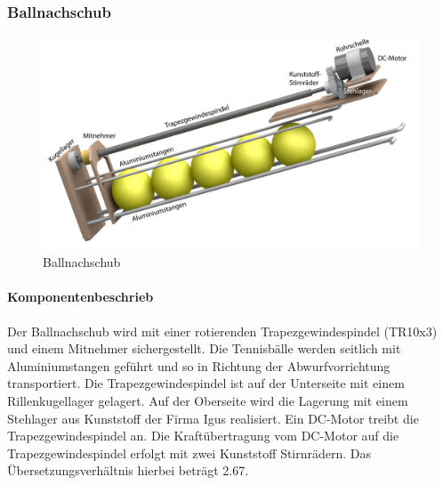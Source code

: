 \subsubsection{Ballnachschub}
\begin{figure}[h!]
	\centering
	\includegraphics[width=0.9\linewidth]{../../fig/Render-Ballnachschubx}
	\caption{Ballnachschub}
	\label{fig:Ballnachschub}
\end{figure}
\paragraph{Komponentenbeschrieb}
Der Ballnachschub wird mit einer rotierenden Trapezgewindespindel (TR10x3) und einem Mitnehmer sichergestellt. Die Tennisbälle werden seitlich mit Aluminiumstangen geführt und so in Richtung der Abwurfvorrichtung transportiert. Die Trapezgewindespindel ist auf der Unterseite mit einem Rillenkugellager gelagert. Auf der Oberseite wird die Lagerung mit einem Stehlager aus Kunststoff der Firma Igus realisiert. Ein DC-Motor treibt die Trapezgewindespindel an. Die Kraftübertragung vom DC-Motor auf die Trapezgewindespindel erfolgt mit zwei Kunststoff Stirnrädern. Das Übersetzungsverhältnis hierbei beträgt 2.67.

